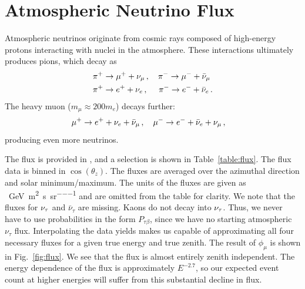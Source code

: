 \section{Atmospheric Neutrino Flux}
Atmospheric neutrinos originate from cosmic rays composed of high-energy protons interacting with nuclei in the atmosphere.
These interactions ultimately produces pions, which decay as 
\begin{align}\label{eq:pion}
    &\pi^+ \to \mu^+ + \nu_\mu\,, \quad \pi^- \to \mu^- + \bar{\nu}_\mu \nonumber \\
    &\pi^+ \to e^+ + \nu_e\,,\,\, \quad \pi^- \to e^- + \bar{\nu}_e\,.
\end{align}
The heavy muon ($m_\mu \approx 200m_e$) decays further:
\begin{align}
    &\mu^+ \to e^+ + \nu_e + \bar{\nu}_\mu\,, \quad \mu^- \to e^- + \bar{\nu}_e + \nu_\mu\,,
\end{align}
producing even more neutrinos.

The flux is provided in \cite{hondaData,hondaArticle}, and a selection is shown in Table~\ref{table:flux}.
The flux data is binned in $\cos(\theta_z)$. The fluxes are averaged over the azimuthal direction and solar minimum/maximum. 
The units of the fluxes are given as \si{\per\GeV \per\metre\squared \per\second \per\steradian} and are omitted
from the table for clarity. 
We note that the fluxes for $\nu_\tau$ and $\bar{\nu}_{\tau}$ are missing. Kaons do not decay into $\nu_\tau$. Thus, we never have to use probabilities in the form 
$P_{\tau \beta}$, since we have no starting atmospheric $\nu_\tau$ flux. 
Interpolating the data yields makes us capable of approximating all four necessary fluxes for a given true energy and true zenith.
The result of $\phi_\mu$ is shown in Fig.~\ref{fig:flux}. We see that the flux is almost entirely zenith independent. 
The energy dependence of the flux is approximately $E^{-2.7}$, so our expected event count at higher energies will suffer from this substantial decline in flux.

